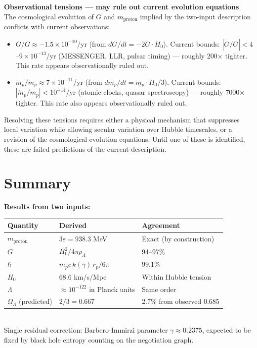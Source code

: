 \documentclass[11pt,letterpaper]{article}
\newenvironment{openbox}{\begin{tcolorbox}[colback=orange!5!white,colframe=orange!60!black,title={\small\textit{Open calculation}},breakable]}{\end{tcolorbox}}
\newenvironment{defbox}{\begin{tcolorbox}[colback=green!3!white,colframe=green!45!black,title={\small\textit{Key result}},breakable]}{\end{tcolorbox}}
\begin{document}
\begin{openbox}
\textbf{Observational tensions --- may rule out current evolution equations}\\[4pt]
The cosmological evolution of $G$ and $m_\text{proton}$ implied by the two-input description conflicts with current observations:
\begin{itemize}\setlength\itemsep{2pt}
\item $\dot{G}/G \approx -1.5\times10^{-10}$/yr (from $dG/dt = -2G \cdot H_0$). Current bounds: $|\dot{G}/G| < 4$--$9\times10^{-13}$/yr (MESSENGER, LLR, pulsar timing) --- roughly 200$\times$ tighter. This rate appears observationally ruled out.
\item $\dot{m}_p/m_p \approx 7\times10^{-11}$/yr (from $dm_p/dt = m_p \cdot H_0/3$). Current bounds: $|\dot{m}_p/m_p| < 10^{-14}$/yr (atomic clocks, quasar spectroscopy) --- roughly 7000$\times$ tighter. This rate also appears observationally ruled out.
\end{itemize}
Resolving these tensions requires either a physical mechanism that suppresses local variation while allowing secular variation over Hubble timescales, or a revision of the cosmological evolution equations. Until one of these is identified, these are failed predictions of the current description.
\end{openbox}

\section{Summary}
\label{sec:orgfe18c05}

\begin{defbox}
\textbf{Results from two inputs:}\\[4pt]
\begin{tabular}{@{}lll@{}}
\toprule
\textbf{Quantity} & \textbf{Derived} & \textbf{Agreement}\\
\midrule
$m_\text{proton}$ & $3\varepsilon = 938.3$ MeV & Exact (by construction)\\
$G$ & $H_0^2/4\pi\rho_\Lambda$ & 94--97\%\\
$\hbar$ & $m_p c\, k(\gamma)\, r_p / 6\pi$ & 99.1\%\\
$H_0$ & 68.6 km/s/Mpc & Within Hubble tension\\
$\Lambda$ & ${\approx}10^{-122}$ in Planck units & Same order\\
$\Omega_\Lambda$ (predicted) & $2/3 = 0.667$ & 2.7\% from observed 0.685\\
\bottomrule
\end{tabular}\\[8pt]
Single residual correction: Barbero-Immirzi parameter $\gamma \approx 0.2375$, expected to be fixed by black hole entropy counting on the negotiation graph.
\end{defbox}
\end{document}
